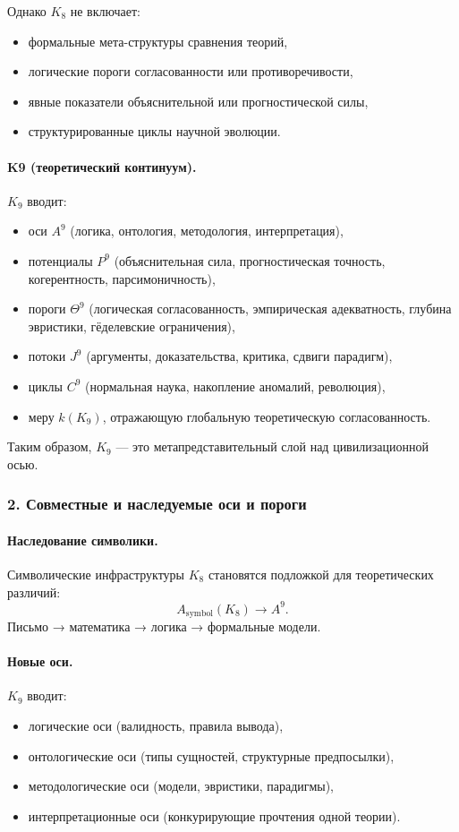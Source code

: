 Однако $K_8$ не включает:
\begin{itemize}
  \item формальные мета-структуры сравнения теорий,
  \item логические пороги согласованности или противоречивости,
  \item явные показатели объяснительной или прогностической силы,
  \item структурированные циклы научной эволюции.
\end{itemize}

\paragraph{K9 (теоретический континуум).}
$K_9$ вводит:
\begin{itemize}
  \item оси $A^9$ (логика, онтология, методология, интерпретация),
  \item потенциалы $P^9$ (объяснительная сила, прогностическая точность,
        когерентность, парсимоничность),
  \item пороги $\Theta^9$ (логическая согласованность, эмпирическая адекватность,
        глубина эвристики, гёделевские ограничения),
  \item потоки $J^9$ (аргументы, доказательства, критика, сдвиги парадигм),
  \item циклы $C^9$ (нормальная наука, накопление аномалий, революция),
  \item меру $k(K_9)$, отражающую глобальную теоретическую согласованность.
\end{itemize}

Таким образом, $K_9$ — это метапредставительный слой над цивилизационной осью.

\subsubsection{2. Совместные и наследуемые оси и пороги}

\paragraph{Наследование символики.}
Символические инфраструктуры $K_8$ становятся подложкой для теоретических
различий:
\[
A_{\mathrm{symbol}}(K_8) \rightarrow A^9.
\]
Письмо → математика → логика → формальные модели.

\paragraph{Новые оси.}
$K_9$ вводит:
\begin{itemize}
  \item логические оси (валидность, правила вывода),
  \item онтологические оси (типы сущностей, структурные предпосылки),
  \item методологические оси (модели, эвристики, парадигмы),
  \item интерпретационные оси (конкурирующие прочтения одной теории).
\end{itemize}

